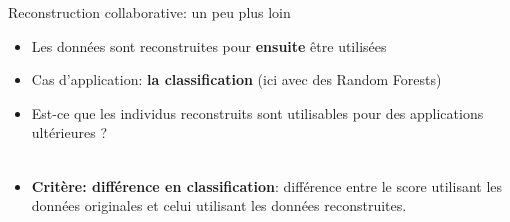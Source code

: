 \documentclass[hyperref={pdfpagelabels=false}]{beamer}
\begin{document}
    \begin{frame}{Reconstruction collaborative: un peu plus loin}
        \begin{itemize}
            \item Les données sont reconstruites pour \textbf{ensuite} être 
                utilisées
            \item Cas d'application: \textbf{la classification} (ici avec des 
                Random Forests)
            \item Est-ce que les individus reconstruits sont utilisables pour 
                des applications ultérieures ?\\~\\
            \item \textbf{Critère: différence en classification}: différence entre le 
                score utilisant les données originales et celui utilisant les 
                données reconstruites.
        \end{itemize}
    \end{frame}
\end{document}
